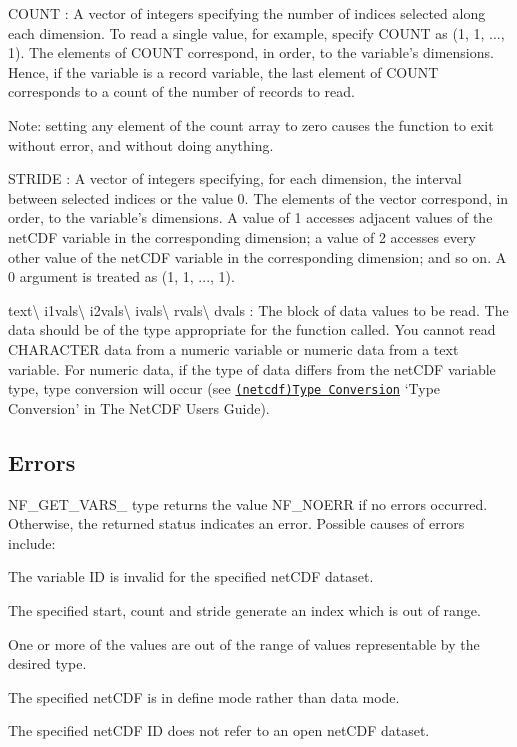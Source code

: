 {\ttfamily C\+O\+U\+NT} \+: A vector of integers specifying the number of indices selected along each dimension. To read a single value, for example, specify C\+O\+U\+NT as (1, 1, ..., 1). The elements of C\+O\+U\+NT correspond, in order, to the variable’s dimensions. Hence, if the variable is a record variable, the last element of C\+O\+U\+NT corresponds to a count of the number of records to read.

Note\+: setting any element of the count array to zero causes the function to exit without error, and without doing anything.

{\ttfamily S\+T\+R\+I\+DE} \+: A vector of integers specifying, for each dimension, the interval between selected indices or the value 0. The elements of the vector correspond, in order, to the variable’s dimensions. A value of 1 accesses adjacent values of the net\+C\+DF variable in the corresponding dimension; a value of 2 accesses every other value of the net\+C\+DF variable in the corresponding dimension; and so on. A 0 argument is treated as (1, 1, ..., 1).

{\ttfamily text}\textbackslash{} {\ttfamily i1vals}\textbackslash{} {\ttfamily i2vals}\textbackslash{} {\ttfamily ivals}\textbackslash{} {\ttfamily rvals}\textbackslash{} {\ttfamily dvals} \+: The block of data values to be read. The data should be of the type appropriate for the function called. You cannot read C\+H\+A\+R\+A\+C\+T\+ER data from a numeric variable or numeric data from a text variable. For numeric data, if the type of data differs from the net\+C\+DF variable type, type conversion will occur (see \href{netcdf.html#Type-Conversion}{\tt (netcdf)Type Conversion} ‘\+Type Conversion’ in The Net\+C\+DF Users Guide).

\subsection*{Errors }

N\+F\+\_\+\+G\+E\+T\+\_\+\+V\+A\+R\+S\+\_\+ type returns the value N\+F\+\_\+\+N\+O\+E\+RR if no errors occurred. Otherwise, the returned status indicates an error. Possible causes of errors include\+:


\begin{DoxyItemize}
\item The variable ID is invalid for the specified net\+C\+DF dataset.
\item The specified start, count and stride generate an index which is out of range.
\item One or more of the values are out of the range of values representable by the desired type.
\item The specified net\+C\+DF is in define mode rather than data mode.
\item The specified net\+C\+DF ID does not refer to an open net\+C\+DF dataset.
\end{DoxyItemize}

